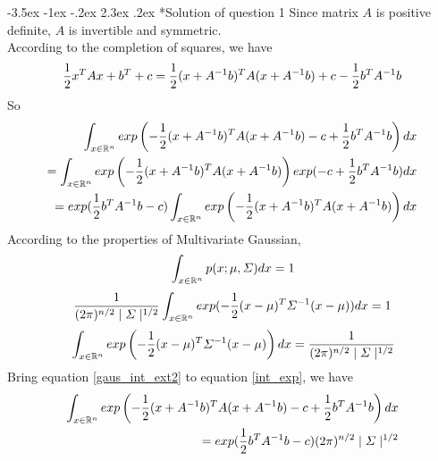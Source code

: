 \documentclass[12pt]{article}
\makeatletter
\renewcommand\section{\@startsection {section}{1}{\z@}%
	{-3.5ex \@plus -1ex \@minus -.2ex}%
	{2.3ex \@plus.2ex}%
	{\normalfont\large\bfseries}}%
\makeatother
\begin{document}
	\section*{Solution of question 1}
	Since matrix $A$ is positive definite, $A$ is invertible and symmetric.\\
	According to the completion of squares, we have
	\begin{equation}{\label{comp_square}}
		\frac{1}{2}x^TAx+b^T+c = \frac{1}{2}(x+A^{-1}b)^TA(x+A^{-1}b)+c-\frac{1}{2}b^TA^{-1}b
	\end{equation}
	So
	\begin{equation}{\label{int_exp}}
	\begin{split}
	\begin{aligned}
		\int_{x\in\mathbb{R}^n}exp\left(-\frac{1}{2}(x+A^{-1}b)^TA(x+A^{-1}b)-c+\frac{1}{2}b^TA^{-1}b\right)dx\\
		=\int_{x\in\mathbb{R}^n}exp\left(-\frac{1}{2}(x+A^{-1}b)^TA(x+A^{-1}b)\right)exp(-c+\frac{1}{2}b^TA^{-1}b)dx\\
		=exp(\frac{1}{2}b^TA^{-1}b-c)\int_{x\in\mathbb{R}^n}exp\left(-\frac{1}{2}(x+A^{-1}b)^TA(x+A^{-1}b)\right)dx
	\end{aligned}
	\end{split}
	\end{equation}
	According to the properties of Multivariate Gaussian,
	\begin{equation}{\label{gaus_int}}
		\int_{x\in\mathbb{R}^n}p(x;\mu,\varSigma)dx = 1
	\end{equation}
	\begin{equation}{\label{gaus_int_ext1}}
		\frac{1}{(2\pi)^{n/2}\mid\varSigma\mid^{1/2}}\int_{x\in\mathbb{R}^n}exp(-\frac{1}{2}(x-\mu)^T\varSigma^{-1}(x-\mu))dx = 1
	\end{equation}
	\begin{equation}{\label{gaus_int_ext2}}
		\int_{x\in\mathbb{R}^n}exp\left(-\frac{1}{2}(x-\mu)^T\varSigma^{-1}(x-\mu)\right)dx = \frac{1}{(2\pi)^{n/2}\mid\varSigma\mid^{1/2}}
	\end{equation}
	\noindent
	Bring equation \ref{gaus_int_ext2} to equation \ref{int_exp}, we have
	\begin{equation}{\label{gaus_int_ext3}}
	\begin{split}
		\int_{x\in\mathbb{R}^n}exp\left(-\frac{1}{2}(x+A^{-1}b)^TA(x+A^{-1}b)-c+\frac{1}{2}b^TA^{-1}b\right)dx\\
		=exp(\frac{1}{2}b^TA^{-1}b-c)(2\pi)^{n/2}\mid\varSigma\mid^{1/2}
	\end{split}
	\end{equation}
	
\end{document}
